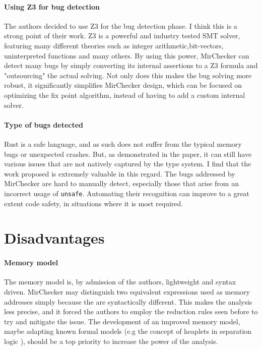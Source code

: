 \documentclass{article}
\begin{document}
 \paragraph{Using Z3 for bug detection} The authors decided to use Z3 for the bug detection phase. I think this is a 
 strong point of their work. Z3 is a powerful and industry tested SMT solver, featuring many different theories such as integer 
 arithmetic,bit-vectors, uninterpreted functions and many others. By using this power, MirChecker can detect many bugs by simply 
 converting its internal assertions to a Z3 formula and "outsourcing" the actual solving. Not only does this makes the bug solving more robust, 
 it significantly simplifies MirChecker design, which can be focused on optimizing the fix point algorithm, instead of having to add a custom internal solver.

 \paragraph{Type of bugs detected} Rust is a safe language, and as such does not suffer from the typical memory bugs or unexpected crashes. But, as demonstrated in the paper, 
 it can still have various issues that are not natively captured by the type system. I find that the work proposed is extremely valuable in this regard. The bugs addressed by MirChecker
 are hard to manually detect, especially those that arise from an incorrect usage of \texttt{unsafe}. Automating their recognition can improve to a great extent code safety, in situations 
 where it is most required.
\section{Disadvantages}

\paragraph{Memory model}
The memory model is, by admission of the authors, lightweight and syntax driven. MirChecker may distinguish 
two  equivalent expressions used as memory addresses simply because the are syntactically different. This makes the analysis 
less precise, and it forced the authors to employ the reduction rules seen before to try and mitigate the issue. The development of an improved
memory model, maybe adapting known formal models  (e.g the concept of heaplets in separation logic \cite{o2019separation}), should be a top priority to  
increase the power of the analysis.
\end{document}
